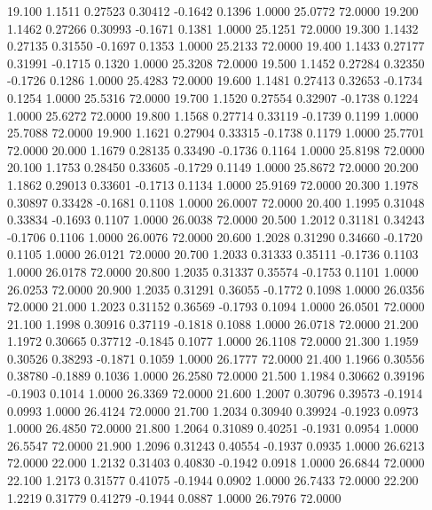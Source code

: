   19.100   1.1511   0.27523   0.30412  -0.1642   0.1396   1.0000  25.0772  72.0000
  19.200   1.1462   0.27266   0.30993  -0.1671   0.1381   1.0000  25.1251  72.0000
  19.300   1.1432   0.27135   0.31550  -0.1697   0.1353   1.0000  25.2133  72.0000
  19.400   1.1433   0.27177   0.31991  -0.1715   0.1320   1.0000  25.3208  72.0000
  19.500   1.1452   0.27284   0.32350  -0.1726   0.1286   1.0000  25.4283  72.0000
  19.600   1.1481   0.27413   0.32653  -0.1734   0.1254   1.0000  25.5316  72.0000
  19.700   1.1520   0.27554   0.32907  -0.1738   0.1224   1.0000  25.6272  72.0000
  19.800   1.1568   0.27714   0.33119  -0.1739   0.1199   1.0000  25.7088  72.0000
  19.900   1.1621   0.27904   0.33315  -0.1738   0.1179   1.0000  25.7701  72.0000
  20.000   1.1679   0.28135   0.33490  -0.1736   0.1164   1.0000  25.8198  72.0000
  20.100   1.1753   0.28450   0.33605  -0.1729   0.1149   1.0000  25.8672  72.0000
  20.200   1.1862   0.29013   0.33601  -0.1713   0.1134   1.0000  25.9169  72.0000
  20.300   1.1978   0.30897   0.33428  -0.1681   0.1108   1.0000  26.0007  72.0000
  20.400   1.1995   0.31048   0.33834  -0.1693   0.1107   1.0000  26.0038  72.0000
  20.500   1.2012   0.31181   0.34243  -0.1706   0.1106   1.0000  26.0076  72.0000
  20.600   1.2028   0.31290   0.34660  -0.1720   0.1105   1.0000  26.0121  72.0000
  20.700   1.2033   0.31333   0.35111  -0.1736   0.1103   1.0000  26.0178  72.0000
  20.800   1.2035   0.31337   0.35574  -0.1753   0.1101   1.0000  26.0253  72.0000
  20.900   1.2035   0.31291   0.36055  -0.1772   0.1098   1.0000  26.0356  72.0000
  21.000   1.2023   0.31152   0.36569  -0.1793   0.1094   1.0000  26.0501  72.0000
  21.100   1.1998   0.30916   0.37119  -0.1818   0.1088   1.0000  26.0718  72.0000
  21.200   1.1972   0.30665   0.37712  -0.1845   0.1077   1.0000  26.1108  72.0000
  21.300   1.1959   0.30526   0.38293  -0.1871   0.1059   1.0000  26.1777  72.0000
  21.400   1.1966   0.30556   0.38780  -0.1889   0.1036   1.0000  26.2580  72.0000
  21.500   1.1984   0.30662   0.39196  -0.1903   0.1014   1.0000  26.3369  72.0000
  21.600   1.2007   0.30796   0.39573  -0.1914   0.0993   1.0000  26.4124  72.0000
  21.700   1.2034   0.30940   0.39924  -0.1923   0.0973   1.0000  26.4850  72.0000
  21.800   1.2064   0.31089   0.40251  -0.1931   0.0954   1.0000  26.5547  72.0000
  21.900   1.2096   0.31243   0.40554  -0.1937   0.0935   1.0000  26.6213  72.0000
  22.000   1.2132   0.31403   0.40830  -0.1942   0.0918   1.0000  26.6844  72.0000
  22.100   1.2173   0.31577   0.41075  -0.1944   0.0902   1.0000  26.7433  72.0000
  22.200   1.2219   0.31779   0.41279  -0.1944   0.0887   1.0000  26.7976  72.0000
